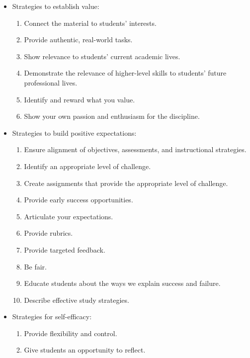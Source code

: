 \begin{itemize}
\item
  Strategies to establish value:

  \begin{enumerate}
      \item
    Connect the material to students' interests.
  \item
    Provide authentic, real-world tasks.
  \item
    Show relevance to students' current academic lives.
  \item
    Demonstrate the relevance of higher-level skills to students' future
    professional lives.
  \item
    Identify and reward what you value.
  \item
    Show your own passion and enthusiasm for the discipline.
  \end{enumerate}
\item
  Strategies to build positive expectations:

  \begin{enumerate}
      \item
    Ensure alignment of objectives, assessments, and instructional
    strategies.
  \item
    Identify an appropriate level of challenge.
  \item
    Create assignments that provide the appropriate level of challenge.
  \item
    Provide early success opportunities.
  \item
    Articulate your expectations.
  \item
    Provide rubrics.
  \item
    Provide targeted feedback.
  \item
    Be fair.
  \item
    Educate students about the ways we explain success and failure.
  \item
    Describe effective study strategies.
  \end{enumerate}
\item
  Strategies for self-efficacy:

  \begin{enumerate}
      \item
    Provide flexibility and control.
  \item
    Give students an opportunity to reflect.
  \end{enumerate}
\end{itemize}

